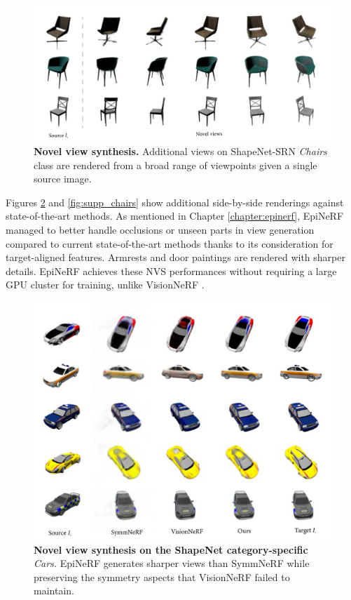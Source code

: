 \begin{figure}[htp!]
    \begin{center}
  \includegraphics[width=\linewidth]{images/epinerf/supp_NVS_Chairs.png}
  \caption{\textbf{Novel view synthesis.} Additional views on ShapeNet-SRN \textit{Chairs} class are rendered from a broad range of viewpoints given a single source image. }
  \label{fig:supp_NVSchairs}
  \end{center}
\end{figure}

Figures \ref{fig:supp_cars} and \ref{fig:supp_chairs} show additional side-by-side renderings against state-of-the-art methods. As mentioned in Chapter \ref{chapter:epinerf}, EpiNeRF managed to better handle occlusions or unseen parts in view generation compared to current state-of-the-art methods thanks to its consideration for target-aligned features. Armrests and door paintings are rendered with sharper details. EpiNeRF achieves these \ac{NVS} performances without requiring a large \ac{GPU} cluster for training, unlike VisionNeRF \cite{lin2023vision}.

\begin{figure}[htp!]
    \begin{center}
  \includegraphics[width=\linewidth]{images/epinerf/supp_Cars_additional_inference.png}
  \caption{\textbf{Novel view synthesis on the ShapeNet category-specific} \textit{Cars. }EpiNeRF generates sharper views than SymmNeRF while preserving the symmetry aspects that VisionNeRF failed to maintain.}
  \label{fig:supp_cars}
  \end{center}
\end{figure}


